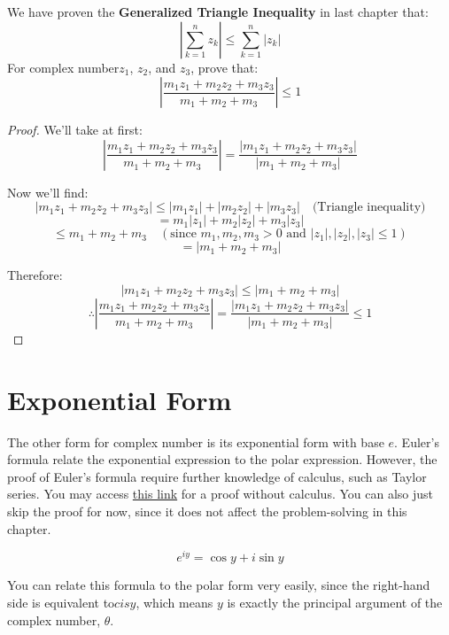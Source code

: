 \documentclass[
	12pt, %
	fleqn, %
	a4paper, %
]{LegrandOrangeBook}
\begin{document}
\begin{exercise}
    We have proven the \textbf{Generalized Triangle Inequality} in last chapter that:
    $$\left|\sum_{k=1}^{n} z_{k}\right| \leq \sum_{k=1}^{n}\left|z_{k}\right|$$
    For complex number$z_1$, $z_2$, and $z_3$, prove that:
    $$\left|\frac{m_{1} z_{1}+m_{2} z_{2}+m_{3} z_{3}}{m_{1}+m_{2}+m_{3}}\right| \leq 1$$
\end{exercise}
\begin{proof}
    
We'll take at first:
\[
\left| \frac{m_1z_1 + m_2z_2 + m_3z_3}{m_1 + m_2 + m_3} \right| = \frac{\left| m_1z_1 + m_2z_2 + m_3z_3 \right|}{\left| m_1 + m_2 + m_3 \right|}
\]

Now we'll find:
\[
\left| m_1z_1 + m_2z_2 + m_3z_3 \right| \leq \left| m_1z_1 \right| + \left| m_2z_2 \right| + \left| m_3z_3 \right| \quad \text{(Triangle inequality)}
\]
\[
= m_1 \left| z_1 \right| + m_2 \left| z_2 \right| + m_3 \left| z_3 \right|
\]
\[
\leq m_1 + m_2 + m_3 \quad (\text{since } m_1, m_2, m_3 > 0 \text{ and } \left| z_1 \right|, \left| z_2 \right|, \left| z_3 \right| \leq 1)
\]
\[
= \left| m_1 + m_2 + m_3 \right|
\]

Therefore:
\[
\left| m_1z_1 + m_2z_2 + m_3z_3 \right| \leq \left| m_1 + m_2 + m_3 \right|
\]
\[
\therefore \left| \frac{m_1z_1 + m_2z_2 + m_3z_3}{m_1 + m_2 + m_3} \right| = \frac{\left| m_1z_1 + m_2z_2 + m_3z_3 \right|}{\left| m_1 + m_2 + m_3 \right|} \leq 1
\]
\end{proof}

\section{Exponential Form}
The other form for complex number is its exponential form with base $e$. Euler's formula relate the exponential
expression to the polar expression. However, the proof of Euler's formula require further knowledge of calculus, such as
Taylor series. You may access \href{https://www.youtube.com/watch?v=mvmuCPvRoWQ&t=78s}{this link} for a proof without
calculus. You can also just skip the proof for now, since it does not affect the problem-solving in this chapter.

\begin{definition}
    \begin{equation}
        e^{i y}=\cos y+i \sin y 
    \end{equation}
\end{definition}
You can relate this formula to the polar form very easily, since the right-hand side is equivalent to$cisy$,
which means $y$ is exactly the principal argument of the complex number, $\theta$.
\end{document}
